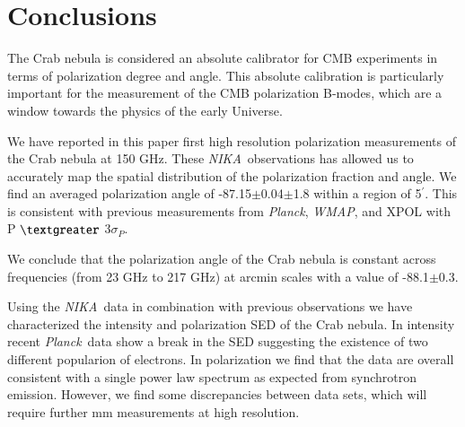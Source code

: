 \documentclass[twocolumn,traditabstract]{aa}
\def\NIKA{\textit{NIKA}}
\def\Planck{\textit{Planck}}
\def\WMAP{\textit{WMAP}}
\begin{document}



\section{Conclusions}\label{sec:conclusions}
The Crab nebula is considered an absolute calibrator for CMB experiments in terms of polarization degree and angle. This absolute calibration is particularly important for the measurement of the CMB polarization B-modes, which are a window towards the physics of the early Universe.

We have reported in this paper first high resolution polarization measurements of the Crab nebula at 150 GHz. These \NIKA\ observations has allowed us to accurately map the spatial distribution of the polarization fraction and angle. 
We find an averaged polarization angle of -87.15$\pm$0.04$\pm$1.8 within a region of 5$^\prime$.
This is consistent with previous measurements from \Planck, \WMAP, and XPOL with P $\textgreater$ 3$\sigma_P$.

We conclude that the polarization angle of the Crab nebula is constant across frequencies (from 23 GHz to 217 GHz) at arcmin scales with a value of -88.1$\pm$0.3. 

Using the \NIKA\ data in combination with previous observations we have characterized the intensity and polarization SED of the Crab nebula. 
In intensity recent \Planck\ data show a break in the SED suggesting the existence of two different popularion of electrons. In polarization we find that the data are overall consistent with a single power law spectrum as expected from synchrotron emission. However, we find some discrepancies between data sets, which will require further mm measurements at high resolution. 
\end{document}
